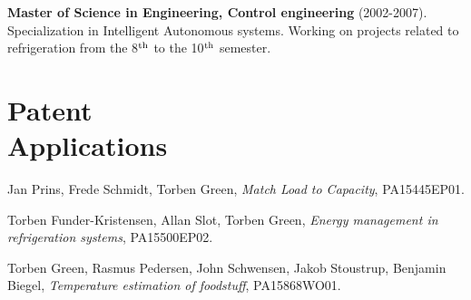 \documentclass[margin,line,a4paper]{resume}
\begin{document}
\begin{resume}
    \textbf{Master of Science in Engineering, Control engineering}
    (2002-2007). Specialization in Intelligent Autonomous systems. Working on projects related to refrigeration from the 8$^{\rm th}$ to the 10$^{\rm th}$ semester.
    










\section{\mysidestyle Patent \\Applications}

Jan Prins, Frede Schmidt, Torben Green, \textit{Match Load to Capacity}, PA15445EP01.

Torben Funder-Kristensen, Allan Slot, Torben Green, \textit{Energy management in refrigeration systems}, PA15500EP02.

Torben Green, Rasmus Pedersen, John Schwensen, Jakob Stoustrup, Benjamin Biegel, \textit{Temperature estimation of foodstuff}, PA15868WO01.


\end{resume}
\end{document}
